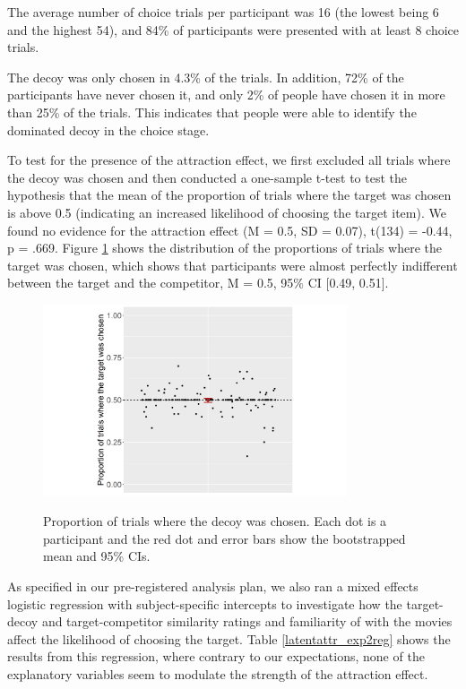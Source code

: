 \documentclass[12pt, a4paper]{article}
\begin{document}
The average number of choice trials per participant was 16 (the lowest being 6 and the highest 54), and 84\% of participants were presented with at least 8 choice trials.

The decoy was only chosen in 4.3\% of the trials. In addition, 72\% of the participants have never chosen it, and only 2\% of people have chosen it in more than 25\% of the trials. This indicates that people were able to identify the dominated decoy in the choice stage. 

To test for the presence of the attraction effect, we first excluded all trials where the decoy was chosen and then conducted a one-sample t-test to test the hypothesis that the mean of the proportion of trials where the target was chosen is above 0.5 (indicating an increased likelihood of choosing the target item). We found no evidence for the attraction effect (M = 0.5, SD = 0.07), t(134) = -0.44, p = .669. Figure \ref{fig:exp2_res} shows the distribution of the proportions of trials where the target was chosen, which shows that participants were almost perfectly indifferent between the target and the competitor, M = 0.5, 95\% CI [0.49, 0.51].


 
\begin{figure}[htb!]
\centering
\captionsetup{justification=centering}
\caption{Proportion of trials where the decoy was chosen. Each dot is a participant and the red dot and error bars show the bootstrapped mean and 95\% CIs.}
\includegraphics[width=0.8\textwidth]{exp2_res.png}
\label{fig:exp2_res}
\end{figure}

As specified in our pre-registered analysis plan, we also ran a mixed effects logistic regression with subject-specific intercepts to investigate how the target-decoy and target-competitor similarity ratings and familiarity of with the movies affect the likelihood of choosing the target. Table \ref{latentattr_exp2reg} shows the results from this regression, where contrary to our expectations, none of the explanatory variables seem to modulate the strength of the attraction effect. 
\end{document}

